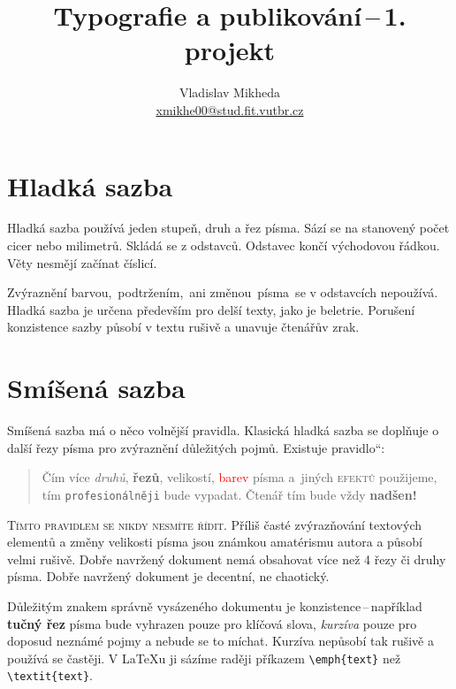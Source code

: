 \documentclass[a4paper,twocolumn,10pt]{article}
\newcommand{\czuv}[1]{\quotedblbase #1\textquotedblleft}
\newcommand{\email}[1]{\href{mailto:#1}{#1}}
\begin{document}
\title{Typografie a publikování\,--\,1. projekt}
\author{Vladislav Mikheda \\ \email{xmikhe00@stud.fit.vutbr.cz}}
\date{}
\maketitle

\section{Hladká sazba}
Hladká sazba používá jeden stupeň, druh a řez písma.
Sází se na stanovený počet cicer nebo milimetrů.
Skládá se z odstavců. Odstavec končí východovou řádkou.
Věty nesmějí začínat číslicí.


Zvýraznění barvou,\, podtržením,\, ani změnou\, písma\, se v odstavcích nepoužívá.
Hladká sazba je určena především pro delší texty, jako je beletrie.
Porušení konzistence sazby působí v textu rušivě a unavuje čtenářův zrak.

\section{Smíšená sazba}\label{sec:2}

Smíšená sazba má o něco volnější pravidla.
Klasická hladká sazba se doplňuje o další řezy písma pro zvýraznění důležitých pojmů. Existuje \czuv{pravidlo}:

\begin{quotation}
    Čím více \textit{druhů}, \textbf{řezů}, {\tiny velikostí}, \textcolor{red}{barev} písma a~jiných \textsc{efektů} použijeme, tím \texttt{profesionálněji} bude \selectfont {\Large dokument} \selectfont vypadat.
    {\huge Č}{\LARGE t}{\Large e}{\large n}á{\small ř} {\footnotesize t}{\scriptsize í}{\tiny m} bude vždy \textbf{\Huge nadšen!}
\end{quotation}


\textsc{Tímto pravidlem se nikdy nesmíte řídit.}
Příliš časté zvýrazňování textových elementů a změny velikosti písma jsou známkou amatérismu autora a působí velmi rušivě.
Dobře navržený dokument nemá obsahovat více než 4 řezy či druhy písma.
Dobře navržený dokument je decentní, ne chaotický.

Důležitým znakem správně vysázeného dokumentu je konzistence\,--\,například \textbf{tučný řez} písma bude vyhrazen pouze pro klíčová slova, \emph{kurzíva} pouze pro doposud neznámé pojmy a nebude se to míchat.
Kurzíva nepůsobí tak rušivě a používá se častěji.
V \LaTeX u ji sázíme raději příkazem \verb|\emph{text}| než \verb|\textit{text}|.
\end{document}

